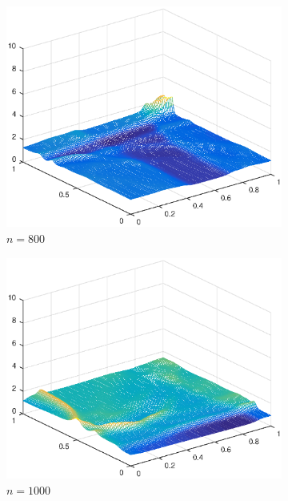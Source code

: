 \begin{figure}[h!]
\begin{subfigure}[t]{0.48\textwidth}
        \centering
        \includegraphics[width=\textwidth]{images/sol_ri_0800cf.eps}
        \caption{$n=800$}
        \label{fig:100}
    \end{subfigure}
    \begin{subfigure}[t]{0.48\textwidth}
        \centering
        \includegraphics[width=\textwidth]{images/sol_ri_1000cf.eps}
        \caption{$n=1000$}
        \label{fig:100}
    \end{subfigure}
    \begin{subfigure}[t]{0.48\textwidth}
        \centering

\end{subfigure}
\end{figure}
